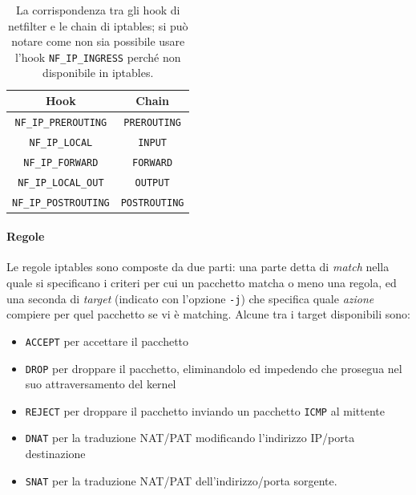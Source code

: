 \begin{table}[h]\label{tbl:iptables-chain}
  \begin{tabular}{|c|c|}
    \hline
    Hook & Chain \\
    \hline
    \hline
    \texttt{NF\_IP\_PREROUTING} & \texttt{PREROUTING}\\
    \hline
    \texttt{NF\_IP\_LOCAL} & \texttt{INPUT}\\
    \hline
    \texttt{NF\_IP\_FORWARD} & \texttt{FORWARD}\\
    \hline
    \texttt{NF\_IP\_LOCAL\_OUT} & \texttt{OUTPUT}\\
    \hline
    \texttt{NF\_IP\_POSTROUTING} & \texttt{POSTROUTING}\\
    \hline
  \end{tabular}
  \caption[La corrispondenza tra gli hook di netfilter e le chain di iptables.]
  {La corrispondenza tra gli hook di netfilter e le chain di iptables; si può notare
  come non sia possibile usare l'hook \texttt{NF\_IP\_INGRESS} perché non disponibile in
  iptables.}
\end{table}


\paragraph{Regole}
Le regole iptables sono composte da due parti: una parte detta di \textit{match}
nella quale si specificano i criteri per cui un pacchetto matcha o meno una regola,
ed una seconda di \textit{target} (indicato con l'opzione \texttt{-j}) che specifica quale
\textit{azione} compiere per quel pacchetto se vi è matching. Alcune tra i
target disponibili sono:
\begin{itemize}
  \item \texttt{ACCEPT} per accettare il pacchetto
  \item \texttt{DROP} per droppare il pacchetto, eliminandolo ed impedendo che
  prosegua nel suo attraversamento del kernel
  \item \texttt{REJECT} per droppare il pacchetto inviando un pacchetto
  \texttt{ICMP} al mittente
  \item \texttt{DNAT} per la traduzione NAT/PAT modificando l'indirizzo
  IP/porta destinazione
  \item \texttt{SNAT} per la traduzione NAT/PAT dell'indirizzo/porta sorgente.
\end{itemize}


